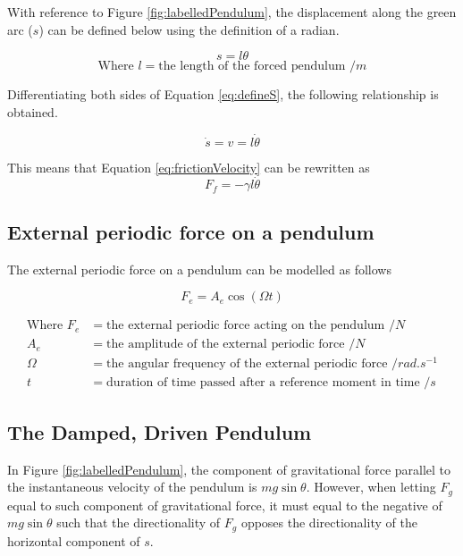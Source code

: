 \documentclass[letterpaper, 12pt]{article}
\begin{document}
With reference to Figure \ref*{fig:labelledPendulum}, the
displacement along the green arc (\(s\)) can be defined
below using the definition of a radian.

\begin{equation} \label{eq:defineS}
    s = l\theta
\end{equation}
\[
    \text{Where } l = \text{the length of the forced pendulum } /\unit{m}
\]

Differentiating both sides of Equation \ref*{eq:defineS},
the following relationship is obtained.

\begin{equation}
    \dot s = v = l \dot \theta
\end{equation}

This means that Equation \ref*{eq:frictionVelocity} can be rewritten as
\begin{equation}
    F_f = -\gamma l \dot\theta
\end{equation}

\subsection{External periodic force on a pendulum}

The external periodic force on a pendulum can be modelled as follows

\begin{equation}
    F_e = A_e \cos (\Omega t)
\end{equation}

\begin{align*}
    \text{Where } F_e & = \text{the external periodic force acting on the pendulum } /\unit{N}
    \\
    A_e               & = \text{the amplitude of the external periodic force } /\unit{N}
    \\
    \Omega            & = \text{the angular frequency of the external periodic force } /\unit{rad.s^{-1}}
    \\
    t                 & = \text{duration of time passed after a reference moment in time } /\unit{s}
\end{align*}

\subsection{The Damped, Driven Pendulum}

In Figure \ref*{fig:labelledPendulum}, the component of
gravitational force parallel to the instantaneous velocity of
the pendulum is \(mg\sin\theta\). However, when letting
\(F_g\) equal to such component of gravitational force,
it must equal to the negative of \(mg\sin\theta\)
such that the directionality of \(F_g\) opposes
the directionality of the horizontal component
of \(s\).
\end{document}
